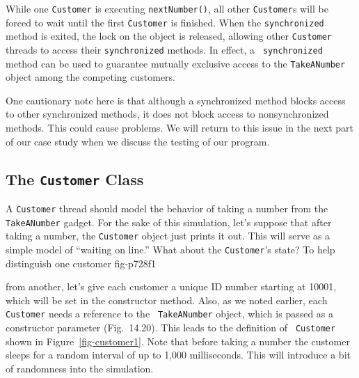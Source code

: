While one {\tt Customer} is executing {\tt nextNumber()}, all other
{\tt Customer}s will be forced to wait until the first {\tt Customer}
is finished.  When the {\tt synchronized} method is exited, the lock
on the object is released, allowing other {\tt Customer} threads to
access their {\tt synchronized} methods.  In effect, a {\tt
synchronized} method can be used to guarantee mutually exclusive
access to the {\tt TakeANumber} object among the competing customers.



\noindent One cautionary note here is that although a synchronized method blocks
access to other synchronized methods, it does not block access to
nonsynchronized methods.   This could cause problems.   We
will return to this issue in the next part of our case study when we discuss the
testing of our program.

\subsection{The {\tt Customer} Class}
\noindent A {\tt Customer} thread should model the behavior of taking a number
from the {\tt TakeANumber} gadget.   For the sake of this simulation,
let's suppose that after taking a number, the {\tt Customer} object just prints it
out.  This will serve as a simple model of ``waiting on line.'' What
about the {\tt Customer}'s state?  To help distinguish one customer
{fig-p728f1}

from another, let's give each customer a unique ID number starting at
10001, which will be set in the constructor method.  Also, as we noted
earlier, each {\tt Customer} needs a reference to the {\tt
TakeANumber} object, which is passed as a constructor parameter
(Fig.~14.20).  This leads to the definition of {\tt
Customer} shown in Figure~\ref{fig-customer1}.  Note that before
taking a number the customer sleeps for a random interval of up to
1,000 milliseconds.  This will introduce a bit of randomness into the
simulation.

